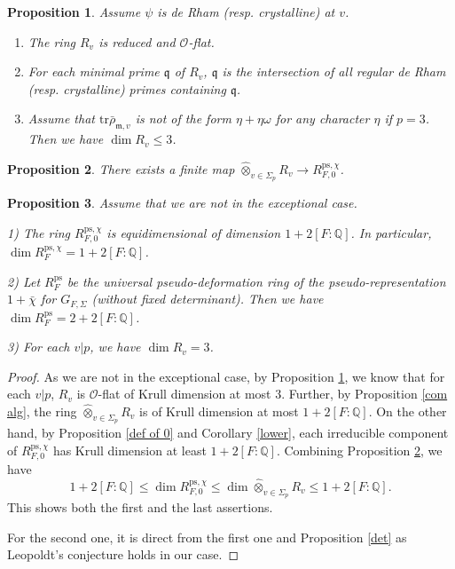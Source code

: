 \documentclass[10pt,a4paper]{amsart}
\newtheorem{prop}{Proposition}
\newcommand{\Q}{\mathbb{Q}}
\newcommand{\cO}{\mathcal{O}}
\newcommand{\km}{\mathfrak{m}}
\newcommand{\kq}{\mathfrak{q}}
\def\ps{\mathrm{ps}}
\newcommand{\tr}{\mathrm{tr}}
\begin{document}
    \begin{prop}\label{R_v}  Assume $\psi$ is de Rham (resp. crystalline) at $v$.
    	\begin{enumerate}
    		\item The ring $R_v$ is reduced and $\cO$-flat.
    		\item  For each minimal prime $\kq$ of $R_v$, $\kq$ is the intersection of all regular de Rham (resp. crystalline) primes containing $\kq$.
    		\item  Assume that $\tr \bar{\rho}_{\km, v} $ is not of the form $\eta + \eta\omega$ for any character $\eta$ if $p=3$. Then we have $\dim R_v \le 3$.
    	\end{enumerate}
    \end{prop}

     \begin{prop}\label{finiteness 2}
    	There exists a finite map $\widehat{\otimes}_{v \in \Sigma_p} R_{v} \to R_{F, 0}^{\ps, \chi} $.
    \end{prop}

    \begin{prop}\label{finite same dim}
    	Assume that we are not in the exceptional case.
    	
    	1) The ring $R_{F, 0}^{\ps, \chi}$ is equidimensional of dimension $1+2[F:\Q]$. In particular, $\dim R_{F}^{\ps, \chi}=1+2[F:\Q]$.
    	
    	2) Let $R_{F}^{\ps}$ be the universal pseudo-deformation ring of the pseudo-representation $1+\bar{\chi}$ for $G_{F, \Sigma}$ (without fixed determinant). Then we have $\dim R_{F}^{\ps}=2+2[F:\Q]$.
    	
    	3) For each $v|p$, we have $\dim R_v=3$.
    \end{prop}

    \begin{proof}
    	As we are not in the exceptional case, by Proposition \ref{R_v}, we know that for each $v|p$, $R_v$ is $\cO$-flat of Krull dimension at most $3$. Further, by Proposition \ref{com alg}, the ring $\widehat{\otimes}_{v \in \Sigma_p} R_{v}$ is of Krull dimension at most $1+2[F: \Q]$. On the other hand, by Proposition \ref{def of 0} and Corollary \ref{lower}, each irreducible component of $ R_{F, 0}^{\ps, \chi}$ has Krull dimension at least $1+2[F:\Q]$. Combining Proposition \ref{finiteness 2}, we have $$
    	1+2[F:\Q] \le \dim R_{F, 0}^{\ps, \chi} \le \dim \widehat{\otimes}_{v \in \Sigma_p} R_{v} \le 1+2[F:\Q].$$
    	This shows both the first and the last assertions.
    	
    	For the second one, it is direct from the first one and Proposition \ref{det} as Leopoldt's conjecture holds in our case.
    	
    \end{proof}
\end{document}
